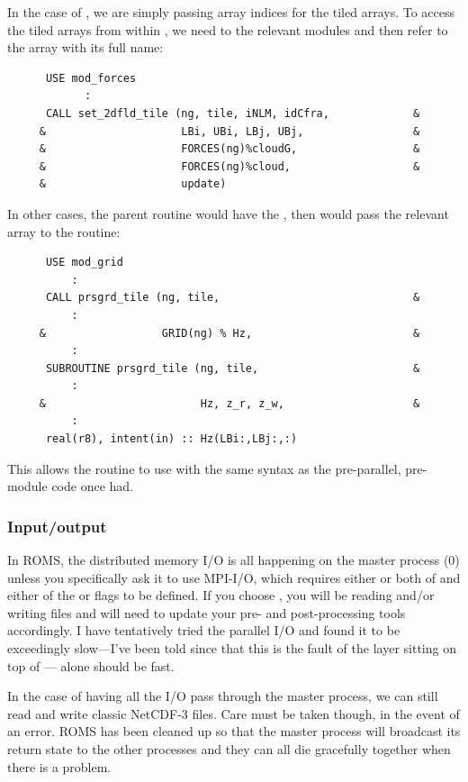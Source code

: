 In the case of , we are simply passing array indices
for the tiled arrays. To access the tiled arrays from within
, we need to  the relevant modules
and then refer to the array with its full name:
\begin{verbatim}
      USE mod_forces
            :
      CALL set_2dfld_tile (ng, tile, iNLM, idCfra,             &
     &                     LBi, UBi, LBj, UBj,                 &
     &                     FORCES(ng)%cloudG,                  &
     &                     FORCES(ng)%cloud,                   &
     &                     update)
\end{verbatim}
In other cases, the parent routine would have the , then
would pass the relevant array to the  routine:
\begin{verbatim}
      USE mod_grid
          :
      CALL prsgrd_tile (ng, tile,                              &
          :
     &                  GRID(ng) % Hz,                         &
          :
      SUBROUTINE prsgrd_tile (ng, tile,                        &
          :
     &                        Hz, z_r, z_w,                    &
          :
      real(r8), intent(in) :: Hz(LBi:,LBj:,:)
\end{verbatim}
This allows the  routine to use  with the same
syntax as the pre-parallel, pre-module code once had.

\subsubsection{Input/output}

In ROMS, the distributed memory I/O is all happening on the master process
(0) unless you specifically ask it to use MPI-I/O, which requires
either or both of   and
either of the  or   flags to be
defined. If you choose , you will be reading and/or writing
 files and will need to update your pre- and post-processing
tools accordingly. I have tentatively tried the parallel I/O and
found it to be exceedingly slow---I've been told since that this
is the fault of the  layer sitting on top of
--- alone should be fast.

In the case of having all the I/O pass through the master process,
we can still read and write classic NetCDF-3 files. Care must be
taken though, in the event of an error. ROMS has been cleaned up so
that the master process will broadcast its return state to the other
processes and they can all die gracefully together when there is a
problem.

